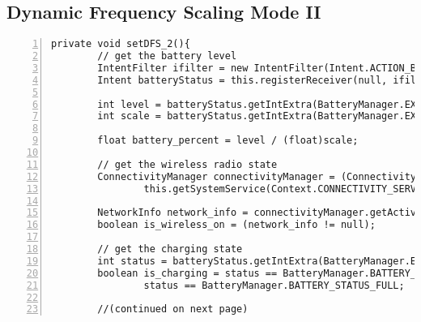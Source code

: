 \documentclass{article}	%
\begin{document}
\subsection{Dynamic Frequency Scaling Mode II}
\begin{lstlisting}[float=*,caption={Dynamic Frequency Scaling Mode II},label={lst:DFS_2},numbers=left]
private void setDFS_2(){
		// get the battery level
		IntentFilter ifilter = new IntentFilter(Intent.ACTION_BATTERY_CHANGED);
		Intent batteryStatus = this.registerReceiver(null, ifilter);

		int level = batteryStatus.getIntExtra(BatteryManager.EXTRA_LEVEL, -1);
		int scale = batteryStatus.getIntExtra(BatteryManager.EXTRA_SCALE, -1);

		float battery_percent = level / (float)scale;

		// get the wireless radio state
		ConnectivityManager connectivityManager = (ConnectivityManager)
				this.getSystemService(Context.CONNECTIVITY_SERVICE);

		NetworkInfo network_info = connectivityManager.getActiveNetworkInfo();
		boolean is_wireless_on = (network_info != null);

		// get the charging state
		int status = batteryStatus.getIntExtra(BatteryManager.EXTRA_STATUS, -1);
		boolean is_charging = status == BatteryManager.BATTERY_STATUS_CHARGING ||
				status == BatteryManager.BATTERY_STATUS_FULL;

		//(continued on next page)		
\end{lstlisting}
\end{document}
